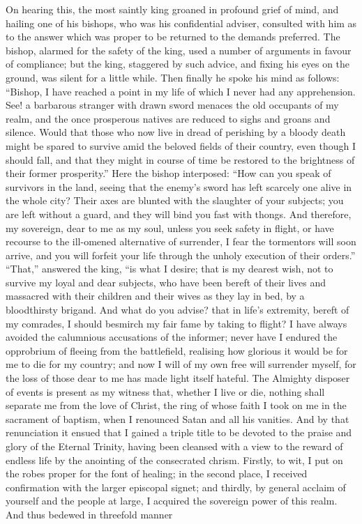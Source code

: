 \documentclass[10pt]{book}
\begin{document}
\begin{paracol}{2}
\switchcolumn

On hearing this, the most saintly king groaned in profound grief of mind, and hailing one of his bishops, who was his confidential adviser, consulted with him as to the answer which was proper to be returned to the demands preferred. The bishop, alarmed for the safety of the king, used a number of arguments in favour of compliance; but the king, staggered by such advice, and fixing his eyes on the ground, was silent for a little while. Then finally he spoke his mind as follows: ``Bishop, I have reached a point in my life of which I never had any apprehension. See! a barbarous stranger with drawn sword menaces the old occupants of my realm, and the once prosperous natives are reduced to sighs and groans and silence. Would that those who now live in dread of perishing by a bloody death might be spared to survive amid the beloved fields of their country, even though I should fall, and that they might in course of time be restored to the brightness of their former prosperity.'' Here the bishop interposed: ``How can you speak of survivors in the land, seeing that the enemy's sword has left scarcely one alive in the whole city? Their axes are blunted with the slaughter of your subjects; you are left without a guard, and they will bind you fast with thongs. And therefore, my sovereign, dear to me as my soul, unless you seek safety in flight, or have recourse to the ill-omened alternative of surrender, I fear the tormentors will soon arrive, and you will forfeit your life through the unholy execution of their orders.'' ``That,'' answered the king, ``is what I desire; that is my dearest wish, not to survive my loyal and dear subjects, who have been bereft of their lives and massacred with their children and their wives as they lay in bed, by a bloodthirsty brigand. And what do you advise? that in life's extremity, bereft of my comrades, I should besmirch my fair fame by taking to flight? I have always avoided the calumnious accusations of the informer; never have I endured the opprobrium of fleeing from the battlefield, realising how glorious it would be for me to die for my country; and now I will of my own free will surrender myself, for the loss of those dear to me has made light itself hateful. The Almighty disposer of events is present as my witness that, whether I live or die, nothing shall separate me from the love of Christ, the ring of whose faith I took on me in the sacrament of baptism, when I renounced Satan and all his vanities. And by that renunciation it ensued that I gained a triple title to be devoted to the praise and glory of the Eternal Trinity, having been cleansed with a view to the reward of endless life by the anointing of the consecrated chrism. Firstly, to wit, I put on the robes proper for the font of healing; in the second place, I received confirmation with the larger episcopal signet; and thirdly, by general acclaim of yourself and the people at large, I acquired the sovereign power of this realm. And thus bedewed in threefold manner\linebreak{} 

\end{paracol}
\end{document}
